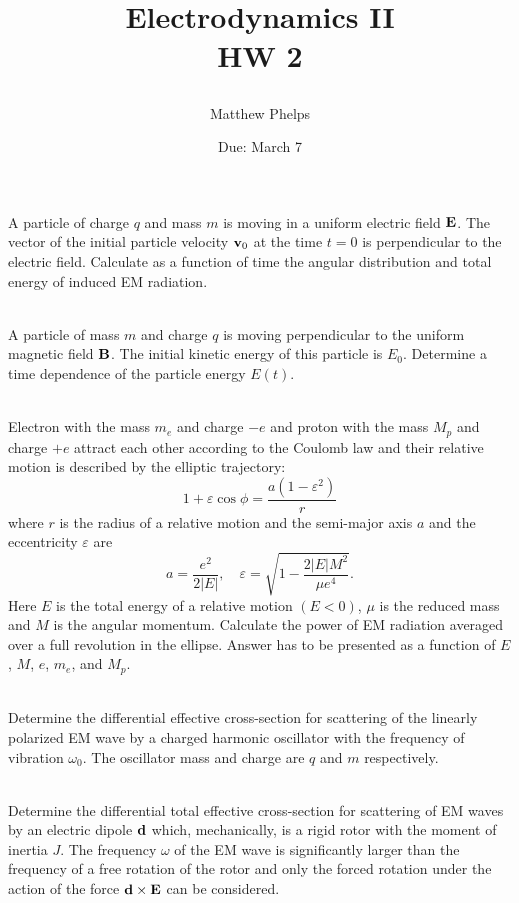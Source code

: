 \documentclass[10pt,letterpaper]{article}
\title{\begin{spacing}{1.2}Electrodynamics II\\HW 2\end{spacing}}
\author{Matthew Phelps}
\date{Due: March 7}
\begin{document}
\maketitle

\benum

\item
A particle of charge $q$ and mass $m$ is moving in a uniform electric field $\mathbf{E}$. The vector of the initial
particle velocity $\mathbf{v}_0$ at the time $t=0$ is perpendicular to the electric field. Calculate as a function of time
the angular distribution and total energy of induced EM radiation.
\\ \\

\item
A particle of mass $m$ and charge $q$ is moving perpendicular to the uniform magnetic field $\mathbf{B}$.
The initial kinetic energy of this particle is $E_0$. Determine a time dependence of the particle energy
$E(t)$.
\\ \\
\item
Electron with the mass $m_e$ and charge $-e$ and proton with the mass $M_p$ and charge $+e$ attract
each other according to the Coulomb law and their relative motion is described by the elliptic trajectory:
\[	
	1+\varepsilon \cos\phi = \frac{a(1-\varepsilon^2)}{r}
\]
where $r$ is the radius of a relative motion and the semi-major axis $a$ and the eccentricity $\varepsilon$
are 
\[
	a= \frac{e^2}{2|E|},\quad \varepsilon = \sqrt{1-\frac{2|E|M^2}{\mu e^4}}.
\]
Here $E$ is the total energy of a relative motion $(E<0)$, $\mu$ is the reduced mass and $M$ is the
angular momentum. Calculate the power of EM radiation averaged over a full revolution in the ellipse. Answer
has to be presented as a function of $E$, $M$, $e$, $m_e$, and $M_p$. 
\\ \\

\item
Determine the differential effective cross-section for scattering of the linearly polarized EM wave by a charged
harmonic oscillator with the frequency of vibration $\omega_0$. The oscillator mass and charge 
are $q$ and $m$ respectively.
\\ \\

\item
Determine the differential total effective cross-section for scattering of EM waves by an electric dipole $\mathbf{d}$
which, mechanically, is a rigid rotor with the moment of inertia $J$. The frequency $\omega$ of the EM wave is
significantly larger than the frequency of a free rotation of the rotor and only the forced rotation under the 
action of the force $\mathbf{d}\times\mathbf{E}$ can be considered.

\eenum 
\end{document}
